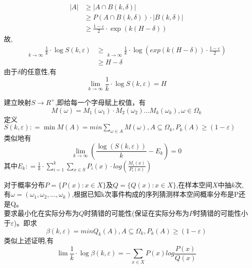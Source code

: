 \begin{prob} 
		\begin{align*}  
            |A| &\geqslant |A \cap B(k,\delta )| \\  
            &\geqslant P(A \cap B(k,\delta )) \cdot |B(k,\delta )|  \\
            &\geqslant \frac{{1 - \varepsilon }}{2} \cdot \exp (k(H - \delta ))
        \end{align*}
        故,
        \begin{align*}  
            \mathop {\underline {\lim } }\limits_{k \to \infty } \frac{1}{k} \cdot \log S(k,\varepsilon ) &\geqslant \mathop {\underline {\lim } }\limits_{k \to \infty } \frac{1}{k} \cdot \log (exp(k(H - \delta )) \cdot \frac{{1 - \varepsilon }}{2})\\
            &\geqslant H-\delta
        \end{align*}
		由于$\delta$的任意性,有
		$$\lim \limits_{k \to \infty } \frac{1}{k} \cdot \log S(k,\varepsilon ) = H$$
	\end{prob}


	\begin{prob} [DMS问题推广]
		\mbox{}\par
		\noindent 建立映射$S \to {R^ + }$,即给每一个字母赋上权值，有
		$$M(\omega ) = {M_1}({\omega _1}) \cdot {M_2}({\omega _2}) \ldots {M_k}({\omega _k}),\omega  \in {\Omega _k}$$
		定义$S(k,\varepsilon ): = \min M(A) = min\sum\limits_{\omega  \in A} {M(\omega )} ,A \subseteq {\Omega _k},{P_k}(A) \geqslant (1 - \varepsilon )$\\
		类似地有
		$$\mathop {\lim }\limits_{k \to \infty } (\frac{{\log (S(k,\varepsilon ))}}{k} - {E_k}) = 0$$
		其中${E_k}: = \frac{1}{k} \cdot \sum\limits_{i = 1}^k {\sum\limits_{x \in S} {{P_i}(x) \cdot log(\frac{{{M_i}(x)}}{{{P_i}(x)}})} }$

	\end{prob}

	\begin{prob} [统计问题]
		\mbox{}\par
		\noindent 对于概率分布$P = \{ P(x):x \in X\}$及$Q = \{ Q(x):x \in X\}$,在样本空间$X$中抽$k$次,有$\omega  = ({\omega _1},{\omega _2}, \ldots ,{\omega _k})$,根据已知k次事件构成的序列猜测样本空间概率分布是P还是Q。\\
		要求最小化在实际分布为$Q$时猜错的可能性(保证在实际分布为$P$时猜错的可能性小于$\varepsilon$)。即求$$\beta (k,\varepsilon ) = min{Q_k}(A),A \subseteq {\Omega _k},{P_k}(A) \geqslant (1 - \varepsilon )$$
        类似上述证明,有
        $$\lim \frac{1}{k} \cdot \log \beta (k,\varepsilon ) =  - \sum\limits_{x \in X} {P(x)log\frac{{P(x)}}{{Q(x)}}} $$

	\end{prob}

